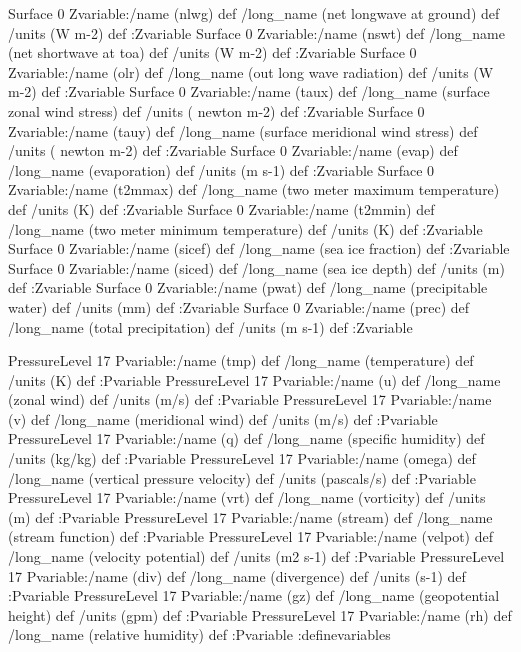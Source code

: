 {\begin{ingrid}
Surface 0 Zvariable:/name (nlwg) def /long_name (net longwave at ground) def /units (W m-2) def :Zvariable
Surface 0 Zvariable:/name (nswt) def /long_name (net shortwave at toa) def /units (W m-2) def :Zvariable
Surface 0 Zvariable:/name (olr) def /long_name (out long wave radiation) def /units (W m-2) def :Zvariable
Surface 0 Zvariable:/name (taux) def /long_name (surface zonal wind stress) def /units ( newton m-2) def :Zvariable
Surface 0 Zvariable:/name (tauy) def /long_name (surface meridional wind stress) def /units ( newton m-2) def :Zvariable
Surface 0 Zvariable:/name (evap) def /long_name (evaporation) def /units (m s-1) def :Zvariable
Surface 0 Zvariable:/name (t2mmax) def /long_name (two meter maximum temperature) def /units (K) def :Zvariable
Surface 0 Zvariable:/name (t2mmin) def /long_name (two meter minimum temperature) def /units (K) def :Zvariable
Surface 0 Zvariable:/name (sicef) def /long_name (sea ice fraction) def :Zvariable
Surface 0 Zvariable:/name (siced) def /long_name (sea ice depth) def /units (m) def :Zvariable
Surface 0 Zvariable:/name (pwat) def /long_name (precipitable water) def /units (mm) def :Zvariable
Surface 0 Zvariable:/name (prec) def /long_name (total precipitation) def /units (m s-1) def :Zvariable

PressureLevel 17 Pvariable:/name (tmp) def /long_name (temperature) def /units (K) def :Pvariable
PressureLevel 17 Pvariable:/name (u) def /long_name (zonal wind) def /units (m/s) def :Pvariable
PressureLevel 17 Pvariable:/name (v) def /long_name (meridional wind) def /units (m/s) def :Pvariable
PressureLevel 17 Pvariable:/name (q) def /long_name (specific humidity)  def /units (kg/kg) def :Pvariable
PressureLevel 17 Pvariable:/name (omega) def /long_name (vertical pressure velocity)  def /units (pascals/s) def :Pvariable
PressureLevel 17 Pvariable:/name (vrt) def /long_name (vorticity)  def /units (m) def :Pvariable
PressureLevel 17 Pvariable:/name (stream) def /long_name (stream function) def :Pvariable
PressureLevel 17 Pvariable:/name (velpot) def /long_name (velocity potential) def /units (m2 s-1) def :Pvariable
PressureLevel 17 Pvariable:/name (div) def /long_name (divergence) def /units (s-1) def :Pvariable
PressureLevel 17 Pvariable:/name (gz) def /long_name (geopotential height) def /units (gpm) def :Pvariable
PressureLevel 17 Pvariable:/name (rh) def /long_name (relative humidity) def :Pvariable
:definevariables


\end{ingrid}}
